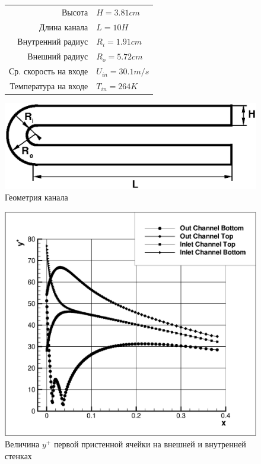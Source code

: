 \begin{figure}[h]
	\begin{minipage}{0.5\linewidth}
			\begin{tabular}{r l}
				\hline
				\label{tableUDuct}
				Высота & $H=3.81cm$ \\
				Длина канала & $L = 10H$ \\
				Внутренний радиус & $R_i = 1.91cm$ \\
				Внешний радиус & $R_o = 5.72cm$ \\
				Ср. скорость на входе & $U_{in} = 30.1 m/s$ \\
				Температура на входе & $T_{in} = 264 K$ \\
			\end{tabular}
	\end{minipage}
	\hspace{2em}
	\begin{minipage}{0.4\linewidth}
		\begin{flushright}
		\includegraphics[scale=0.4]{UDuct}
		\caption{Геометрия канала}
		\end{flushright}
	\end{minipage}
\end{figure}
\newpage
\begin{figure}[h]
	\centering
	\includegraphics[scale=0.4]{uDuctyplus}
	\caption{Величина $y^{+}$ первой пристенной ячейки на внешней и внутренней стенках}
	\label{fig:uDuctyplus}
\end{figure}
\clearpage


